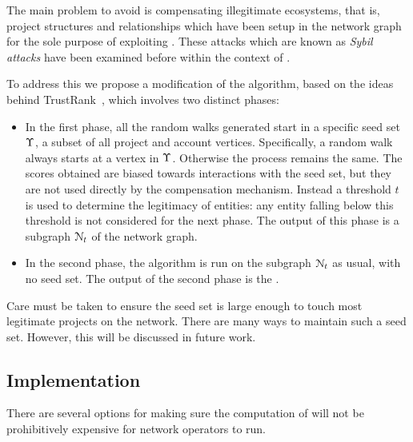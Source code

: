 The main problem to avoid is compensating illegitimate ecosystems, that is,
project structures and relationships which have been setup in the
network graph for the sole purpose of exploiting \osrank{}.
These attacks which are known as \emph{Sybil attacks} have been examined
before within the context of \pagerank{} \cite{pagerank-sybil}.

To address this we propose a modification of the \pagerank{} algorithm, based
on the ideas behind TrustRank~\cite{trustrank}, which involves two distinct
phases:

\begin{itemize}
\item In the first phase, all the random walks generated start in a specific
  seed set $\Upsilon$, a subset of all project and account vertices. Specifically, a random
  walk always starts at a vertex in $\Upsilon$. Otherwise the process remains
  the same. The scores obtained are biased towards interactions with the seed
  set, but they are not used directly by the compensation mechanism. Instead a
  threshold $t$ is used to determine the legitimacy of entities: any entity
  falling below this threshold is not considered for the next phase. The output
  of this phase is a subgraph $\mathcal{N}_t$ of the network graph.
\item In the second phase, the algorithm is run on the subgraph
  $\mathcal{N}_t$ as usual, with no seed set. The output of the second
  phase is the \osrank{}.
\end{itemize}
Care must be taken to ensure the seed set is large enough to touch most
legitimate projects on the network.  There are many ways to maintain such a
seed set. However, this will be discussed in future work.

\subsection{Implementation}

There are several options for making sure the computation of \osrank{}
will not be prohibitively expensive for network operators to run.

